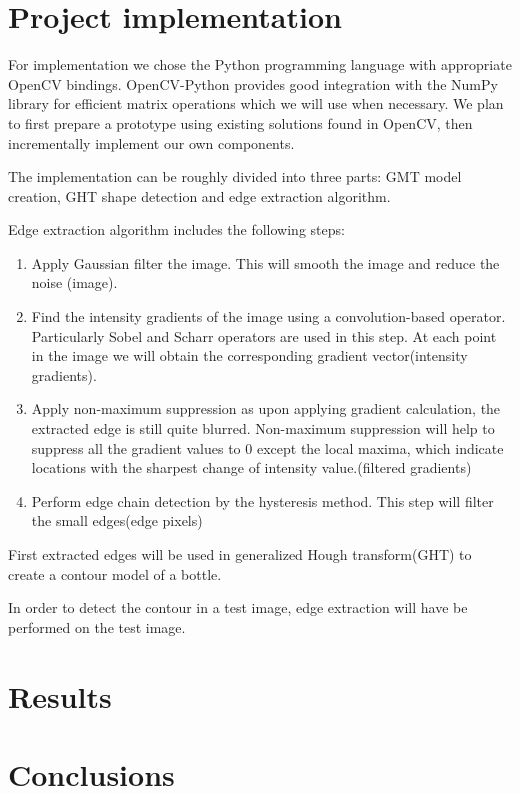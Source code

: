 \documentclass[letterpaper,12pt]{article}
\begin{document}
\section{Project implementation}


For implementation we chose the Python programming language with appropriate OpenCV bindings. OpenCV-Python provides good integration with the NumPy library for efficient matrix operations which we will use when necessary.
We plan to first prepare a prototype using existing solutions found in OpenCV, then incrementally implement our own components.

The implementation can be roughly divided into three parts: GMT model creation, GHT shape detection and edge extraction algorithm.

Edge extraction algorithm includes the following steps:

\begin{enumerate}
	\item Apply Gaussian filter the image. This will smooth the image and reduce the noise (image).
    \item Find the intensity gradients of the image using a convolution-based operator. Particularly Sobel and Scharr operators are used in this step. At each point in the image we will obtain the corresponding gradient vector(intensity gradients).

    \item Apply non-maximum suppression as upon applying gradient calculation, the extracted edge is still quite blurred. Non-maximum suppression will help to suppress all the gradient values to 0 except the local maxima, which indicate locations with the sharpest change of intensity value.(filtered gradients)
	    \item Perform edge chain detection by the hysteresis method. This step will filter the small edges(edge pixels) 
\end{enumerate}

First extracted edges will be used in generalized Hough transform(GHT) to create a contour model of a bottle.


In order to detect the contour in a test image, edge extraction will have be performed on the test image. 


\section{Results}


\section{Conclusions}
\end{document}
